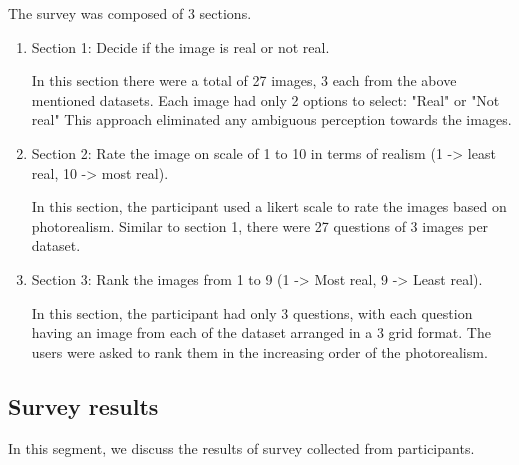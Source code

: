 The survey was composed of 3 sections.
\begin{enumerate}
    \item Section 1: Decide if the image is real or not real.

    In this section there were a total of 27 images, 3 each from the above mentioned datasets.
    Each image had only 2 options to select: "Real" or "Not real"
    This approach eliminated any ambiguous perception towards the images.

    \item Section 2: Rate the image on scale of 1 to 10 in terms of realism (1 -> least real, 10 -> most real).

    In this section, the participant used a likert scale to rate the images based on photorealism.
    Similar to section 1, there were 27 questions of 3 images per dataset.

    \item Section 3: Rank the images from 1 to 9 (1 -> Most real, 9 -> Least real).

    In this section, the participant had only 3 questions, with each question having an image from each of the dataset arranged in a 3 grid format.
    The users were asked to rank them in the increasing order of the photorealism.
\end{enumerate}

\subsection{Survey results}\label{subsec:survey-results}
In this segment, we discuss the results of survey collected from participants.

